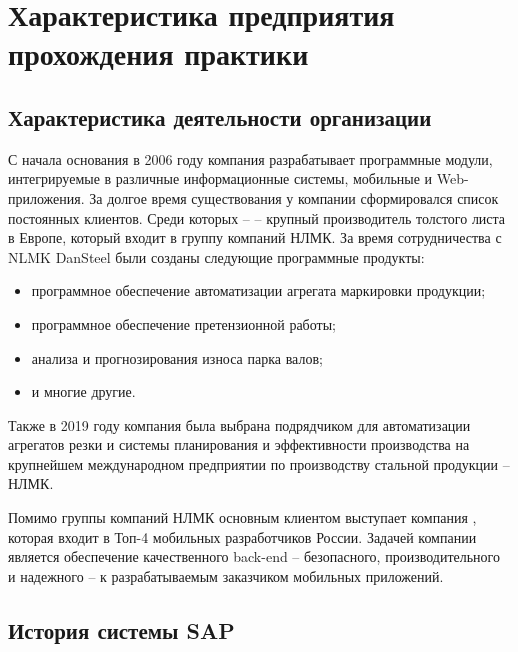 \section{Характеристика предприятия прохождения практики}
\subsection{Характеристика деятельности организации}
С начала основания в 2006 году компания  разрабатывает
программные модули, интегрируемые в различные информационные системы, мобильные
и Web- приложения. За долгое время существования у компании сформировался список
постоянных клиентов. Среди которых --  -- крупный
производитель толстого листа в Европе, который входит в группу компаний НЛМК. За
время сотрудничества с NLMK DanSteel были созданы следующие программные
продукты:
\begin{itemize}
    \item программное обеспечение автоматизации агрегата маркировки продукции;
    \item программное обеспечение претензионной работы;
    \item анализа и прогнозирования износа парка валов;
    \item и многие другие.
\end{itemize}

Также в 2019 году компания была выбрана подрядчиком для автоматизации агрегатов
резки и системы планирования и эффективности производства на крупнейшем
международном предприятии по производству стальной продукции -- НЛМК.

Помимо группы компаний НЛМК основным клиентом  выступает
компания , которая входит в Топ-4 мобильных разработчиков
России. Задачей компании является обеспечение качественного back-end --
безопасного, производительного и надежного -- к разрабатываемым заказчиком
мобильных приложений.

\subsection{История системы SAP}
